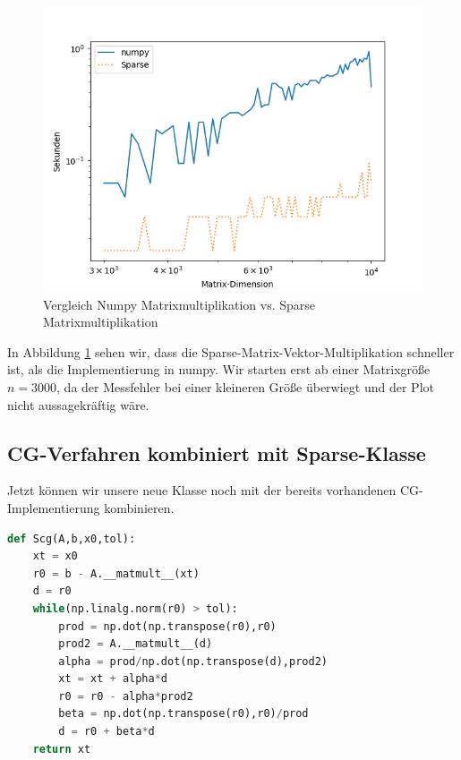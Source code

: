 \begin{figure}
    \centering
    \includegraphics[width=0.8\linewidth]{Aufgabe_1/matmult_plot.png}
    \caption{Vergleich Numpy Matrixmultiplikation vs. Sparse Matrixmultiplikation}
    \label{mul}
\end{figure}
\FloatBarrier

In Abbildung \ref{mul} sehen wir, dass die Sparse-Matrix-Vektor-Multiplikation schneller ist, als die Implementierung in numpy.
Wir starten erst ab einer Matrixgröße $n=3000$, da der Messfehler bei einer kleineren Größe überwiegt und der Plot nicht aussagekräftig wäre.

\subsection{CG-Verfahren kombiniert mit Sparse-Klasse}
Jetzt können wir unsere neue Klasse noch mit der bereits vorhandenen CG-Implementierung kombinieren. \\
\begin{lstlisting}[language=Python]
def Scg(A,b,x0,tol):
    xt = x0
    r0 = b - A.__matmult__(xt)
    d = r0
    while(np.linalg.norm(r0) > tol):
        prod = np.dot(np.transpose(r0),r0)
        prod2 = A.__matmult__(d)
        alpha = prod/np.dot(np.transpose(d),prod2)
        xt = xt + alpha*d
        r0 = r0 - alpha*prod2
        beta = np.dot(np.transpose(r0),r0)/prod
        d = r0 + beta*d
    return xt
\end{lstlisting}

